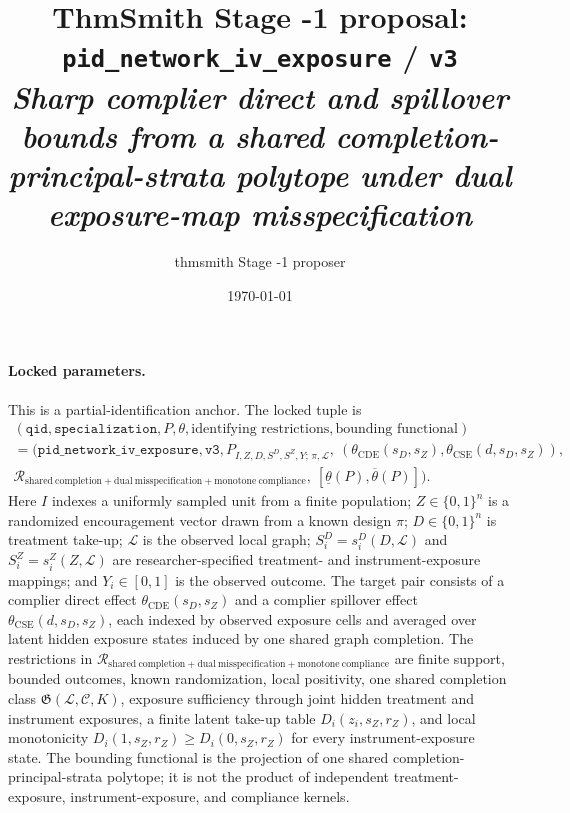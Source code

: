 \documentclass[11pt]{article}
\title{ThmSmith Stage -1 proposal: \texttt{pid\_network\_iv\_exposure} / \texttt{v3}\\ \large\textit{Sharp complier direct and spillover bounds from a shared completion-principal-strata polytope under dual exposure-map misspecification}}
\author{thmsmith Stage -1 proposer}
\date{\today}
\theoremstyle{definition}
\theoremstyle{plain}
\theoremstyle{remark}
\begin{document}
\maketitle

\paragraph{Locked parameters.}
This is a partial-identification anchor. The locked tuple is
\[
\begin{gathered}
(\texttt{qid},\texttt{specialization},P,\theta,\text{identifying restrictions},
\text{bounding functional})\\
=
(\texttt{pid\_network\_iv\_exposure},\texttt{v3},
P_{I,Z,D,S^D,S^Z,Y;\,\pi,\mathcal L},
\ (\theta_{\mathrm{CDE}}(s_D,s_Z),\theta_{\mathrm{CSE}}(d,s_D,s_Z)),\\
\mathcal{R}_{\mathrm{shared\ completion+dual\ misspecification+monotone\ compliance}},
\ [\underline\theta(P),\overline\theta(P)]) .
\end{gathered}
\]
Here \(I\) indexes a uniformly sampled unit from a finite population; \(Z\in\{0,1\}^n\) is a randomized encouragement vector drawn from a known design \(\pi\); \(D\in\{0,1\}^n\) is treatment take-up; \(\mathcal L\) is the observed local graph; \(S_i^D=s_i^D(D,\mathcal L)\) and \(S_i^Z=s_i^Z(Z,\mathcal L)\) are researcher-specified treatment- and instrument-exposure mappings; and \(Y_i\in[0,1]\) is the observed outcome. The target pair consists of a complier direct effect \(\theta_{\mathrm{CDE}}(s_D,s_Z)\) and a complier spillover effect \(\theta_{\mathrm{CSE}}(d,s_D,s_Z)\), each indexed by observed exposure cells and averaged over latent hidden exposure states induced by one shared graph completion. The restrictions in \(\mathcal{R}_{\mathrm{shared\ completion+dual\ misspecification+monotone\ compliance}}\) are finite support, bounded outcomes, known randomization, local positivity, one shared completion class \(\mathfrak G(\mathcal L,\mathcal C,K)\), exposure sufficiency through joint hidden treatment and instrument exposures, a finite latent take-up table \(D_i(z_i,s_Z,r_Z)\), and local monotonicity \(D_i(1,s_Z,r_Z)\ge D_i(0,s_Z,r_Z)\) for every instrument-exposure state. The bounding functional is the projection of one shared completion-principal-strata polytope; it is not the product of independent treatment-exposure, instrument-exposure, and compliance kernels.
\end{document}
